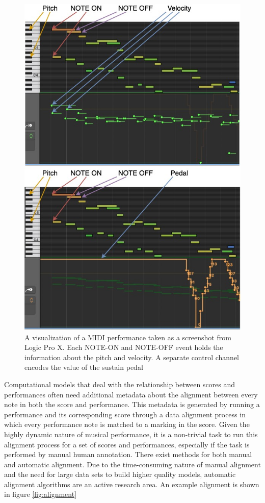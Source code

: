 \begin{figure}
    \centering
    \includegraphics[width=0.7\linewidth]{figs/ch2/midi.jpg}
    \caption{A visualization of a MIDI performance taken as a screenshot from Logic Pro X. Each NOTE-ON and NOTE-OFF event holds the information about the pitch and velocity. A separate control channel encodes the value of the sustain pedal}
    \label{fig:midi}
\end{figure}

Computational models that deal with the relationship between scores and performances often need additional metadata about the alignment between every note in both the score and performance. This metadata is generated by running a performance and its corresponding score through a data alignment process in which every performance note is matched to a marking in the score. Given the highly dynamic nature of musical performance, it is a non-trivial task to run this alignment process for a set of scores and performances, especially if the task is performed by manual human annotation. There exist methods for both manual and automatic alignment. Due to the time-consuming nature of manual alignment and the need for large data sets to build higher quality models, automatic alignment algorithms are an active research area. An example alignment is shown in figure \ref{fig:alignment}

